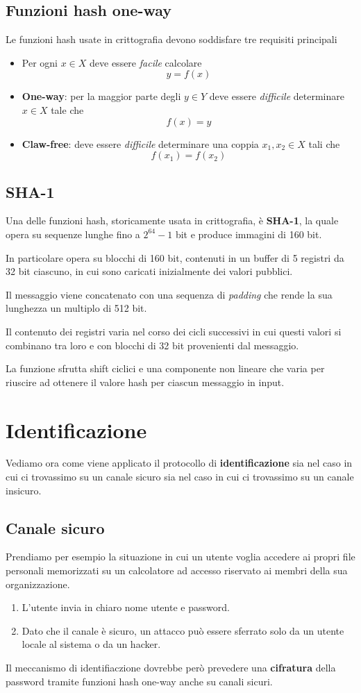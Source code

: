 \subsection{Funzioni hash one-way}
Le funzioni hash usate in crittografia devono soddisfare tre requisiti principali
\begin{itemize}
	\item Per ogni $x \in X$ deve essere \emph{facile} calcolare
	      \[ y = f(x) \]
	\item \textbf{One-way}: per la maggior parte degli $y \in Y$ deve essere \emph{difficile} determinare $x \in X$
	      tale che
	      \[ f(x) = y \]
	\item \textbf{Claw-free}: deve essere \emph{difficile} determinare una coppia $x_1, x_2 \in X$ tali che
	      \[ f(x_1) = f(x_2) \]
\end{itemize}

\subsection{SHA-1}
Una delle funzioni hash, storicamente usata in crittografia, \`e \textbf{SHA-1}, la quale opera su sequenze lunghe
fino a $2^{64} - 1$ bit e produce immagini di 160 bit.

In particolare opera su blocchi di 160 bit, contenuti in un buffer di 5 registri da 32 bit ciascuno, in cui sono
caricati inizialmente dei valori pubblici.

Il messaggio viene concatenato con una sequenza di \emph{padding} che rende la sua lunghezza un multiplo di 512 bit.

Il contenuto dei registri varia nel corso dei cicli successivi in cui questi valori si combinano tra loro e con
blocchi di 32 bit provenienti dal messaggio.

La funzione sfrutta shift ciclici e una componente non lineare che varia per riuscire ad ottenere il valore hash per
ciascun messaggio in input.

\section{Identificazione}
Vediamo ora come viene applicato il protocollo di \textbf{identificazione} sia nel caso in cui ci trovassimo su un
canale sicuro sia nel caso in cui ci trovassimo su un canale insicuro.

\subsection{Canale sicuro}
Prendiamo per esempio la situazione in cui un utente voglia accedere ai propri file personali memorizzati su un
calcolatore ad accesso riservato ai membri della sua organizzazione.
\begin{enumerate}
	\item L'utente invia in chiaro nome utente e password.
	\item Dato che il canale \`e sicuro, un attacco pu\`o essere sferrato solo da un utente locale al sistema o da
	      un hacker.
\end{enumerate}
Il meccanismo di identifiaczione dovrebbe per\`o prevedere una \textbf{cifratura} della password tramite funzioni hash
one-way anche su canali sicuri.

